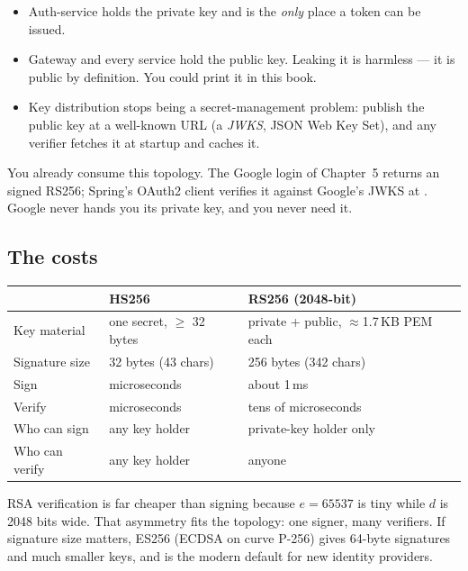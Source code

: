 \begin{itemize}
  \item Auth-service holds the private key and is the \emph{only}
  place a token can be issued.
  \item Gateway and every service hold the public key. Leaking it is
  harmless --- it is public by definition. You could print it in this
  book.
  \item Key distribution stops being a secret-management problem: publish
  the public key at a well-known URL (a \emph{JWKS}, JSON Web Key Set),
  and any verifier fetches it at startup and caches it.
\end{itemize}

You already consume this topology. The Google login of Chapter~5 returns
an  signed RS256; Spring's OAuth2 client verifies it
against Google's JWKS at
. Google never hands you
its private key, and you never need it.

\subsection{The costs}

\begin{center}
\begin{tabular}{@{}lll@{}}
\toprule
 & HS256 & RS256 (2048-bit) \\
\midrule
Key material & one secret, $\ge$ 32 bytes & private + public, $\approx$1.7\,KB PEM each \\
Signature size & 32 bytes (43 chars) & 256 bytes (342 chars) \\
Sign & microseconds & about 1\,ms \\
Verify & microseconds & tens of microseconds \\
Who can sign & any key holder & private-key holder only \\
Who can verify & any key holder & anyone \\
\bottomrule
\end{tabular}
\end{center}

RSA verification is far cheaper than signing because $e = 65537$ is tiny
while $d$ is 2048 bits wide. That asymmetry fits the topology: one signer,
many verifiers. If signature size matters, ES256 (ECDSA on curve P-256)
gives 64-byte signatures and much smaller keys, and is the modern
default for new identity providers.


